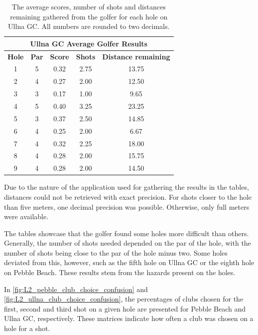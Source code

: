 \documentclass{kththesis}
\begin{document}
\begin{table}
    \centering
    \begin{tabular}{|c|c|c|c|c|} \hline
    \multicolumn{5}{|c|}{\textbf{Ullna GC Average Golfer Results}} \\ \hline
        \textbf{Hole} & \textbf{Par} & \textbf{Score} & \textbf{Shots} & \textbf{Distance remaining}  \\ \hline
        1 & 5 & 0.32 & 2.75 & 13.75 \\ \hline
        2 & 4 & 0.27 & 2.00 & 12.50 \\ \hline
        3 & 3 & 0.17 & 1.00 & 9.65 \\ \hline
        4 & 5 & 0.40 & 3.25 & 23.25 \\ \hline
        5 & 3 & 0.37 & 2.50 & 14.85 \\ \hline
        6 & 4 & 0.25 & 2.00 & 6.67 \\ \hline
        7 & 4 & 0.32 & 2.25 & 18.00 \\ \hline
        8 & 4 & 0.28 & 2.00 & 15.75 \\ \hline
        9 & 4 & 0.28 & 2.00 & 14.50 \\ \hline
    \end{tabular}
    \caption{The average scores, number of shots and distances remaining gathered from the golfer for each hole on Ullna GC. All numbers are rounded to two decimals.}
    \label{tab:L2_ullna_average_results}
\end{table}

Due to the nature of the application used for gathering the results in the tables, distances could not be retrieved with exact precision. For shots closer to the hole than five meters, one decimal precision was possible. Otherwise, only full meters were available. 

The tables showcase that the golfer found some holes more difficult than others. Generally, the number of shots needed depended on the par of the hole, with the number of shots being close to the par of the hole minus two. Some holes deviated from this, however, such as the fifth hole on Ullna GC or the eighth hole on Pebble Beach. These results stem from the hazards present on the holes.

In \autoref{fig:L2_pebble_club_choice_confusion} and \autoref{fig:L2_ullna_club_choice_confusion}, the percentages of clubs chosen for the first, second and third shot on a given hole are presented for Pebble Beach and Ullna GC, respectively. These matrices indicate how often a club was chosen on a hole for a shot. 
\end{document}

